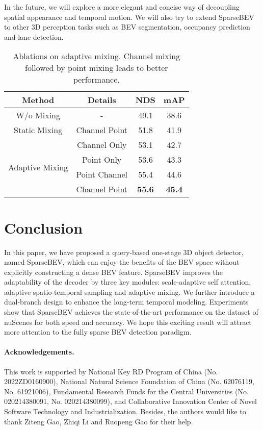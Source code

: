 \documentclass[10pt,twocolumn,letterpaper]{article}
\begin{document}
In the future, we will explore a more elegant and concise way of decoupling spatial appearance and temporal motion. We will also try to extend SparseBEV to other 3D perception tasks such as BEV segmentation, occupancy prediction and lane detection.

\begin{table}[t]
  \centering
  \begin{tabular}{c|c|cc}
    \toprule
    Method & Details & NDS & mAP \\
    \midrule
    W/o Mixing & - & 49.1 & 38.6 \\
    Static Mixing & Channel  Point & 51.8 & 41.9 \\
    \midrule
    \multirow{4}{*}{Adaptive Mixing} & Channel Only & 53.1 & 42.7 \\
    & Point Only & 53.6 & 43.3 \\
    & Point  Channel & 55.4 & 44.6 \\
    & Channel  Point & \textbf{55.6} & \textbf{45.4} \\
    \bottomrule
  \end{tabular}
  \caption{Ablations on adaptive mixing. Channel mixing followed by point mixing leads to better performance.}
  \label{table:mixing}
  \vspace{-6pt}
\end{table}

\section{Conclusion}

In this paper, we have proposed a query-based one-stage 3D object detector, named SparseBEV, which can enjoy the benefits of the BEV space without explicitly constructing a dense BEV feature. SparseBEV improves the adaptability of the decoder by three key modules: scale-adaptive self attention, adaptive spatio-temporal sampling and adaptive mixing. We further introduce a dual-branch design to enhance the long-term temporal modeling. Experiments show that SparseBEV achieves the state-of-the-art performance on the dataset of nuScenes for both speed and accuracy. We hope this exciting result will attract more attention to the fully sparse BEV detection paradigm.

\paragraph{Acknowledgements.} This work is supported by National Key RD Program of China (No. 2022ZD0160900), National Natural Science Foundation of China (No. 62076119, No. 61921006), Fundamental Research Funds for the Central Universities (No. 020214380091, No. 020214380099), and Collaborative Innovation Center of Novel Software Technology and Industrialization. Besides, the authors would like to thank Ziteng Gao, Zhiqi Li and Ruopeng Gao for their help.
\end{document}
